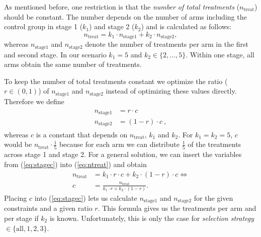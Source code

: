 \documentclass[bimj,fleqn]{w-art}
\theoremstyle{plain}
\theoremstyle{definition}
\begin{document}
As mentioned before, one restriction is that the \emph{number of total treatments} ($n_{\text{treat}}$) should be constant.
The number depends on the number of arms including the control group in stage 1 ($k_1$) and stage 2 ($k_2$) and is calculated as follows:
\begin{equation}
  \label{eq:ntreat}
  n_{\text{treat}} = k_1 \cdot n_{\text{stage1}} + k_2 \cdot n_{\text{stage2}},
\end{equation}
whereas $n_{\text{stage1}}$ and $n_{\text{stage2}}$ denote the number of treatments per arm in the first and second stage.
In our scenario $k_1 = 5$ and $k_2 \in \{2, \ldots, 5\}$.
Within one stage, all arms obtain the same number of treatments.

To keep the number of total treatments constant we optimize the ratio ($r \in (0,1)$) of $n_{\text{stage1}}$ and $n_{\text{stage2}}$ instead of optimizing these values directly.
Therefore we define
\begin{align}
  \label{eq:stagec}
  \begin{split}
  n_{\text{stage1}} &= r \cdot c \\
  n_{\text{stage2}} &= (1-r) \cdot c \ ,
  \end{split}
\end{align}
whereas $c$ is a constant that depends on $n_{\text{treat}}$, $k_1$ and $k_2$.
For $k_1 = k_2 = 5$, $c$ would be $n_{\text{treat}} \cdot \frac{1}{5}$ because for each arm we can distribute $\frac{1}{5}$ of the treatments across stage 1 and stage 2.
For a general solution, we can insert the variables from (\ref{eq:stagec}) into (\ref{eq:ntreat}) and obtain
\begin{align}
  \label{eq:ntreatc}
  n_{\text{treat}} &= k_1 \cdot r \cdot c + k_2 \cdot (1-r) \cdot c \Leftrightarrow \\
  \label{eq:ntreatcc}
  c &= \frac{n_{\text{treat}}}{k_1 \cdot r + k_2 \cdot (1-r)}.
\end{align}
Placing $c$ into (\ref{eq:stagec}) lets us calculate $n_{\text{stage1}}$ and $n_{\text{stage2}}$ for the given constraints and a given ratio $r$.
This formula gives us the treatments per arm and per stage if $k_2$ is known. 
Unfortunately, this is only the case for \emph{selection strategy} $\in \{\text{all},1,2,3\}$.
\end{document}
